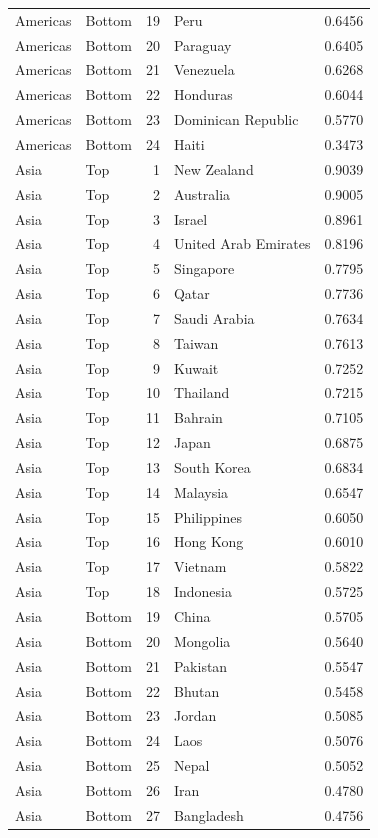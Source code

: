 \begin{table}
\begin{tabular}{llrlr}
Americas & Bottom & 19 & Peru & 0.6456 \\
Americas & Bottom & 20 & Paraguay & 0.6405 \\
Americas & Bottom & 21 & Venezuela & 0.6268 \\
Americas & Bottom & 22 & Honduras & 0.6044 \\
Americas & Bottom & 23 & Dominican Republic & 0.5770 \\
Americas & Bottom & 24 & Haiti & 0.3473 \\
Asia & Top & 1 & New Zealand & 0.9039 \\
Asia & Top & 2 & Australia & 0.9005 \\
Asia & Top & 3 & Israel & 0.8961 \\
Asia & Top & 4 & United Arab Emirates & 0.8196 \\
Asia & Top & 5 & Singapore & 0.7795 \\
Asia & Top & 6 & Qatar & 0.7736 \\
Asia & Top & 7 & Saudi Arabia & 0.7634 \\
Asia & Top & 8 & Taiwan & 0.7613 \\
Asia & Top & 9 & Kuwait & 0.7252 \\
Asia & Top & 10 & Thailand & 0.7215 \\
Asia & Top & 11 & Bahrain & 0.7105 \\
Asia & Top & 12 & Japan & 0.6875 \\
Asia & Top & 13 & South Korea & 0.6834 \\
Asia & Top & 14 & Malaysia & 0.6547 \\
Asia & Top & 15 & Philippines & 0.6050 \\
Asia & Top & 16 & Hong Kong & 0.6010 \\
Asia & Top & 17 & Vietnam & 0.5822 \\
Asia & Top & 18 & Indonesia & 0.5725 \\
Asia & Bottom & 19 & China & 0.5705 \\
Asia & Bottom & 20 & Mongolia & 0.5640 \\
Asia & Bottom & 21 & Pakistan & 0.5547 \\
Asia & Bottom & 22 & Bhutan & 0.5458 \\
Asia & Bottom & 23 & Jordan & 0.5085 \\
Asia & Bottom & 24 & Laos & 0.5076 \\
Asia & Bottom & 25 & Nepal & 0.5052 \\
Asia & Bottom & 26 & Iran & 0.4780 \\
Asia & Bottom & 27 & Bangladesh & 0.4756 \\

\end{tabular}
\end{table}
